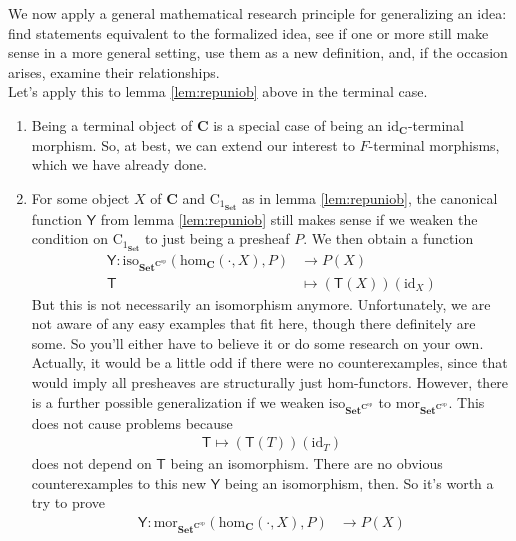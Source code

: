 We now apply a general mathematical research principle for generalizing an idea: find statements equivalent to the formalized idea, see if one or more still make sense in a more general setting, use them as a new definition, and, if the occasion arises, examine their relationships.
\\
Let's apply this to lemma \ref{lem:repuniob} above in the terminal case.
\begin{enumerate}
\item[(a)]
Being a terminal object of $\mathbf{C}$ is a special case of being an $\mathrm{id}_{\mathbf{C}}$-terminal morphism.
So, at best, we can extend our interest to $F$-terminal morphisms, which we have already done.
\item[(b)]
For some object $X$ of $\mathbf{C}$ and $\mathrm{C}_{1_{\mathbf{Set}}}$ as in lemma \ref{lem:repuniob}, the canonical function $\mathsf{Y}$ from lemma \ref{lem:repuniob} still makes sense if we weaken the condition on $\mathrm{C}_{1_{\mathbf{Set}}}$ to just being a presheaf $P$.
We then obtain a function
\begin{align*}
  \mathsf{Y}
  \colon
  \mathrm{iso}_{\mathbf{Set}^{\mathbf{C}^{\mathrm{op}}}}
  \left(
    \mathrm{hom}_{\mathbf{C}}(\cdot,X),
    P
  \right)
  &\rightarrow
  P(X)
  \\
  \mathsf{T}
  &\mapsto
  (\mathsf{T}(X))(\mathrm{id}_{X})
\end{align*}
But this is not necessarily an isomorphism anymore.
Unfortunately, we are not aware of any easy examples that fit here, though there definitely are some.
So you'll either have to believe it or do some research on your own.
Actually, it would be a little odd if there were no counterexamples, since that would imply all presheaves are structurally just hom-functors.
However, there is a further possible generalization if we weaken $\mathrm{iso}_{\mathbf{Set}^{\mathbf{C}^{\mathrm{op}}}}$ to $\mathrm{mor}_{\mathbf{Set}^{\mathbf{C}^{\mathrm{op}}}}$.
This does not cause problems because
\begin{align*}
  \mathsf{T}
  \mapsto
  (\mathsf{T}(T))(\mathrm{id}_{T})
\end{align*}
does not depend on $\mathsf{T}$ being an isomorphism.
There are no obvious counterexamples to this new $\mathsf{Y}$ being an isomorphism, then.
So it's worth a try to prove
\begin{align*}
  \mathsf{Y}
  \colon
  \mathrm{mor}_{\mathbf{Set}^{\mathbf{C}^{\mathrm{op}}}}
  \left(
    \mathrm{hom}_{\mathbf{C}}(\cdot,X),
    P
  \right)
  &\rightarrow
  P(X)

\end{align*}
\end{enumerate}
